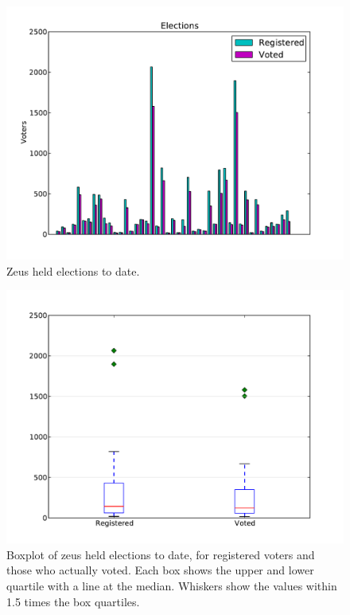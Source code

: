 \documentclass[letterpaper,10pt]{article}
\begin{document}
\begin{figure}[ht]
  \begin{center}
    \includegraphics[scale=0.7]{elections_to_date.pdf}
  \end{center}
  \caption{Zeus held elections to date.}
  \label{fig:elections_to_date}
\end{figure}

\begin{figure}[ht]
  \begin{center}
    \includegraphics[scale=0.7]{elections_to_date_boxplot.pdf}
  \end{center}
  \caption{Boxplot of zeus held elections to date, for registered
    voters and those who actually voted. Each box shows the upper and
    lower quartile with a line at the median. Whiskers show the values
    within 1.5 times the box quartiles.}
  \label{fig:elections_to_date_boxplot}
\end{figure}
\end{document}
